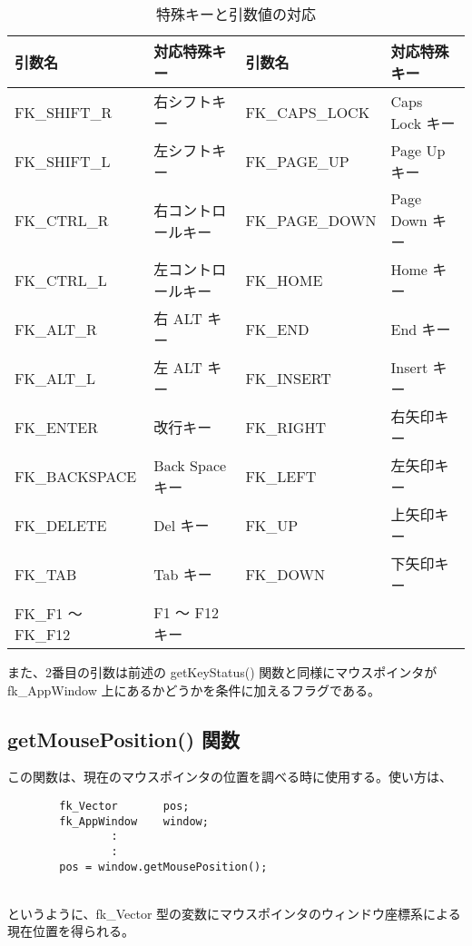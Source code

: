 \begin{table}[H]
\caption{特殊キーと引数値の対応}
\label{tbl:fkSpecialKey}
\begin{center}
\begin{tabular}{|p{3cm}|p{3cm}||p{3cm}|p{3cm}|}
\hline
引数名 & 対応特殊キー & 引数名 & 対応特殊キー \\ \hline \hline
FK\_SHIFT\_R	& 右シフトキー &
	FK\_CAPS\_LOCK	& Caps Lock キー \\ \hline
FK\_SHIFT\_L	& 左シフトキー &
	FK\_PAGE\_UP	& Page Up キー \\ \hline
FK\_CTRL\_R	& 右コントロールキー &
	FK\_PAGE\_DOWN	& Page Down キー \\ \hline
FK\_CTRL\_L	& 左コントロールキー &
	FK\_HOME	& Home キー \\ \hline
FK\_ALT\_R	& 右 ALT キー &
	FK\_END		& End キー \\ \hline
FK\_ALT\_L	& 左 ALT キー &
	FK\_INSERT	& Insert キー \\ \hline
FK\_ENTER	& 改行キー &
	FK\_RIGHT	& 右矢印キー \\ \hline
FK\_BACKSPACE	& Back Space キー &
	FK\_LEFT	& 左矢印キー \\ \hline
FK\_DELETE	& Del キー &
	FK\_UP		& 上矢印キー \\ \hline
FK\_TAB		& Tab キー &
	FK\_DOWN	& 下矢印キー \\ \hline
FK\_F1 〜 FK\_F12 & F1 〜 F12 キー &
		& \\ \hline
\end{tabular}
\end{center}
\end{table}

また、2番目の引数は前述の getKeyStatus() 関数と同様にマウスポインタが
fk\_AppWindow 上にあるかどうかを条件に加えるフラグである。

\subsection*{getMousePosition() 関数}
この関数は、現在のマウスポインタの位置を調べる時に使用する。使い方は、
\\
\begin{breakbox}
\begin{verbatim}
        fk_Vector       pos;
        fk_AppWindow    window;
                :
                :
        pos = window.getMousePosition();
\end{verbatim}
\end{breakbox}
~ \\
というように、fk\_Vector 型の変数にマウスポインタのウィンドウ座標系による現在位置を得られる。

